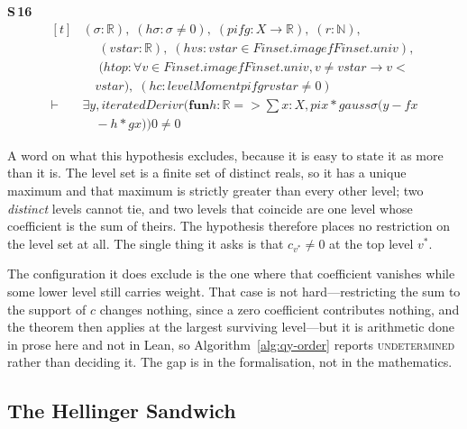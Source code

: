 \noindent\textbf{S\,16}\quad{}
{\footnotesize\[ \begin{aligned}[t]
&(\sigma : \mathbb{R} ),\; (\mathit{hσ} : \sigma \neq 0),\; (\mathit{pi} \mathit{f} \mathit{g} : \mathit{X} \to \mathbb{R} ),\; (\mathit{r} : \mathbb{N} ),\\
&\quad \; (\mathit{vstar} : \mathbb{R} ),\; (\mathit{hvs} : \mathit{vstar} \in \mathit{Finset}.\mathit{image} \mathit{f} \mathit{Finset}.\mathit{univ}),\\
&\quad \; (\mathit{htop} : \forall \mathit{v} \in \mathit{Finset}.\mathit{image} \mathit{f} \mathit{Finset}.\mathit{univ}, \mathit{v} \neq \mathit{vstar} \to \mathit{v} <\\
&\quad \mathit{vstar}),\; (\mathit{hc} : \mathit{levelMoment} \mathit{pi} \mathit{f} \mathit{g} \mathit{r} \mathit{vstar} \neq 0)\\
\vdash\;&\exists \mathit{y}, \mathit{iteratedDeriv} \mathit{r} (\mathbf{fun} \mathit{h} : \mathbb{R} => \textstyle\sum \mathit{x} : \mathit{X}, \mathit{pi} \mathit{x} * \mathit{gauss} \sigma (\mathit{y} - \mathit{f} \mathit{x}\\
&\quad - \mathit{h} * \mathit{g} \mathit{x})) 0 \neq 0
\end{aligned} \]}


A word on what this hypothesis excludes, because it is easy to state it as more than it is.
The level set is a finite set of distinct reals, so it has a unique maximum and that maximum
is strictly greater than every other level; two \emph{distinct} levels cannot tie, and two
levels that coincide are one level whose coefficient is the sum of theirs. The hypothesis
therefore places no restriction on the level set at all. The single thing it asks is that
$c_{v^{*}}\neq0$ at the top level $v^{*}$.

The configuration it does exclude is the one where that coefficient vanishes while some lower
level still carries weight. That case is not hard---restricting the sum to the support of $c$
changes nothing, since a zero coefficient contributes nothing, and the theorem then applies
at the largest surviving level---but it is arithmetic done in prose here and not in Lean, so
Algorithm~\ref{alg:qy-order} reports \textsc{undetermined} rather than deciding it. The gap is
in the formalisation, not in the mathematics.

\subsection{The Hellinger Sandwich}
\label{sec:qy-sandwich}

